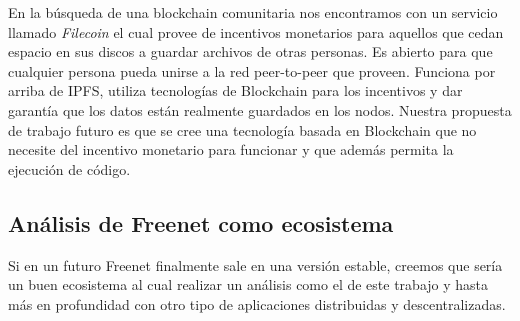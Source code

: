 En la búsqueda de una blockchain comunitaria nos encontramos con un servicio llamado \textit{Filecoin} \cite{filecoin} el cual provee de incentivos monetarios para aquellos que cedan espacio en sus discos a guardar archivos de otras personas. Es abierto para que cualquier persona pueda unirse a la red peer-to-peer que proveen. Funciona por arriba de IPFS, utiliza tecnologías de Blockchain para los incentivos y dar garantía que los datos están realmente guardados en los nodos. Nuestra propuesta de trabajo futuro es que se cree una tecnología basada en Blockchain que no necesite del incentivo monetario para funcionar y que además permita la ejecución de código.

\subsection{Análisis de Freenet como ecosistema}

Si en un futuro Freenet finalmente sale en una versión estable, creemos que sería un buen ecosistema al cual realizar un análisis como el de este trabajo y hasta más en profundidad con otro tipo de aplicaciones distribuidas y descentralizadas.
